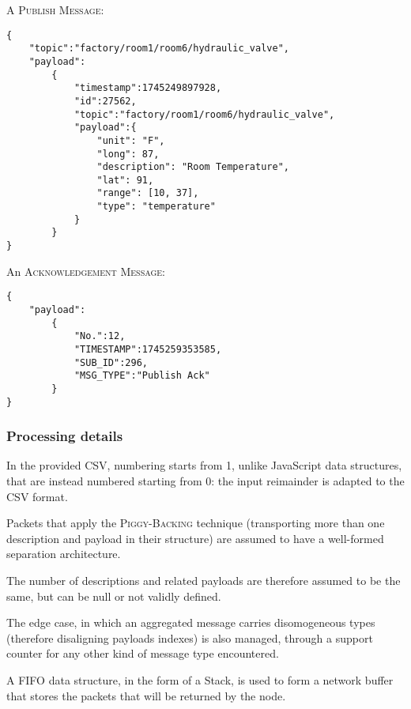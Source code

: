 \documentclass[a4paper,11pt]{article} %
\begin{document}
    \medskip

    A \textsc{Publish Message}:

    \begin{verbatim}
{
    "topic":"factory/room1/room6/hydraulic_valve",
    "payload":
        {
            "timestamp":1745249897928,
            "id":27562,
            "topic":"factory/room1/room6/hydraulic_valve",
            "payload":{
                "unit": "F",
                "long": 87,
                "description": "Room Temperature",
                "lat": 91,
                "range": [10, 37],
                "type": "temperature"
            }
        }
}
    \end{verbatim}

    \smallskip

    An \textsc{Acknowledgement Message}:

    \begin{verbatim}
{
    "payload":
        {
            "No.":12,
            "TIMESTAMP":1745259353585,
            "SUB_ID":296,
            "MSG_TYPE":"Publish Ack"
        }
}
    \end{verbatim}

    \subsubsection{Processing details}

    In the provided CSV, numbering starts from 1, unlike JavaScript data structures, that are instead numbered starting from 0: the input reimainder is adapted to the CSV format.

    \smallskip

    Packets that apply the \textsc{Piggy-Backing} technique (transporting more than one description and payload in their structure) are assumed to have a well-formed separation architecture.

    \smallskip

    The number of descriptions and related payloads are therefore assumed to be the same, but can be null or not validly defined.

    \smallskip

    The edge case, in which an aggregated message carries disomogeneous types (therefore disaligning payloads indexes) is also managed, through a support counter for any other kind of message type encountered.

    \smallskip

    A FIFO data structure, in the form of a Stack, is used to form a network buffer that stores the packets that will be returned by the node.
\end{document}

